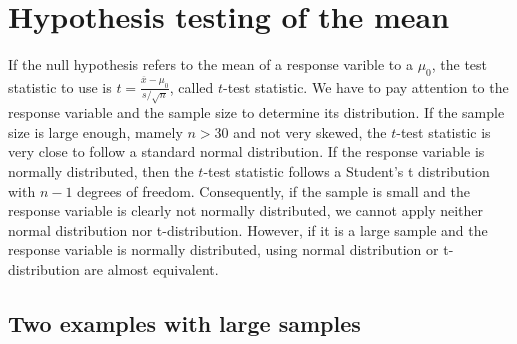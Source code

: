 
\section{Hypothesis testing of the mean}
\label{HTofMean}

If the null hypothesis refers to the mean of a response varible to a  $\mu_0$, the test statistic to use is $t= \frac{\overline{x}-\mu_0}{s/\sqrt{n}}$, called $t$-test statistic.
We have to pay attention to the response variable and the sample size to determine its distribution. If the sample size is large enough, mamely $n>30$ and not very skewed, the $t$-test statistic is very close to follow a standard normal distribution. If the response variable is normally distributed, then  the $t$-test statistic follows a Student's t distribution with $n-1$ degrees of freedom. Consequently, if the sample is small and the response variable is clearly not normally distributed, we cannot apply neither normal distribution nor t-distribution. However, if it is a large sample and the response variable is normally distributed, using normal distribution or t-distribution are almost equivalent.

\subsection{Two examples with large samples \vspace{-3mm}}



